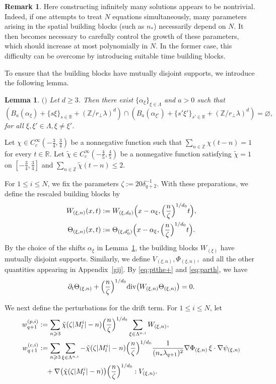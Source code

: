 \documentclass[UTF-8,reqno]{amsart}
\numberwithin{equation}{section}
\newtheorem{lemma}[theorem]{Lemma}
\theoremstyle{definition}
\newtheorem{remark}[theorem]{Remark}
\def\geq{\geqslant}
\def\leq{\leqslant}
\def\div{\mathord{{\rm div}}}
\def\bl{\begin{lemma}}
\def\el{\end{lemma}}
\def\br{\begin{remark}}
\def\er{\end{remark}}
\def\geq{\geqslant}
\def\leq{\leqslant}
\def\div{\mathord{{\rm div}}}
\begin{document}
\br
 Here constructing infinitely many   solutions appears to be   nontrivial. 
Indeed, if one attempts to treat $N$ equations simultaneously, many parameters arising in the spatial building blocks (such as $n_*$) necessarily depend on $N$. 
It then becomes necessary to carefully control the growth of these parameters, which should increase at most polynomially in $N$. In the former case, this difficulty can be overcome by introducing suitable time building blocks. 
\er
To ensure that the building blocks have mutually disjoint supports, we introduce the following lemma.
\bl\label{lem:4}
$($\cite[Lemma 3]{BMS}$)$
Let $d\geq3$. Then there exist $\{\alpha_\xi\}_{\xi\in\Lambda}$ and $a>0$ such that
$$(B_a(\alpha_\xi)+\{s\xi\}_{s\in \mathbb{R}}+(\mathbb{Z}/r_\perp\lambda)^d)\cap
(B_a(\alpha_{\xi'})+\{s'\xi'\}_{s'\in \mathbb{R}}+(\mathbb{Z}/r_\perp\lambda)^d)=\varnothing,$$
for all $\xi,\xi'\in\Lambda ,\xi\neq\xi'$.
\el 


Let
$
\chi\in C_c^\infty(-\frac34,\frac34)
$
be a nonnegative function such that
$
\sum_{n\in\mathbb{Z}}\chi(t-n)=1
$
for every $t\in\mathbb{R}$.
Let
$
\tilde{\chi}\in C_c^\infty(-\frac45,\frac45)
$
be a nonnegative function satisfying
$
\tilde{\chi}=1
$
on
$
[-\frac34,\frac34]
$
and
$
\sum_{n\in\mathbb{Z}}\tilde{\chi}(t-n)\leq2.
$

For $1\leq i\leq N$, we fix the parameters
$
\zeta:=20\delta_{q+2}^{-1}.
$ 
With these preparations, we define the rescaled building blocks by
\begin{align*}
W_{(\xi,n)}(x,t)
&:=
W_{(\xi,d_0)}
\Bigl(
x-\alpha_\xi,
\Bigl(\frac{n}{\zeta}\Bigr)^{1/d_0}
t
\Bigr),
\\
\Theta_{(\xi,n)}(x,t)
&:=
\Theta_{(\xi,d_0')}
\Bigl(
x-\alpha_\xi,
\Bigl(\frac{n}{\zeta}\Bigr)^{1/d_0}
t
\Bigr).
\end{align*}
By the choice of the shifts $\alpha_\xi$ in Lemma~\ref{lem:4}, the building blocks $W_{(\xi)}$ have mutually disjoint supports.
Similarly, we define
$
V_{(\xi,n)},
\Phi_{(\xi,n)},
$
and all the other quantities appearing in Appendix~\ref{gij}. 
By \eqref{eq:ptthe+} and \eqref{eq:parth}, we have
\begin{align}
\partial_t\Theta_{(\xi,n)}
+
\Bigl(\frac{n}{\zeta}\Bigr)^{1/d_0}
\div\bigl(
W_{(\xi,n)}\Theta_{(\xi,n)}
\bigr)
=
0. \notag
\end{align}

We next define the perturbations for the drift term. 
For $1\leq i\leq N$, let
\begin{align*}
w_{q+1}^{(p,i)}
&:=
\sum_{n\geq3}
\tilde{\chi}(\zeta|M_l^i|-n)
\Bigl(\frac{n}{\zeta}\Bigr)^{1/d_0}
\sum_{\xi\in\Lambda^{n,i}}
W_{(\xi,n)},\notag\\
w_{q+1}^{(c,i)}
&:=
\sum_{n\geq3}
\sum_{\xi\in\Lambda^{n,i}}
-\tilde{\chi}(\zeta|M_l^i|-n)
\Bigl(\frac{n}{\zeta}\Bigr)^{1/d_0}
\frac1{(n_*\lambda_{q+1})^2}
\nabla\Phi_{(\xi,n)}
\,\xi\cdot\nabla\psi_{(\xi,n)}
\\
&\quad
+
\nabla\bigl(
\tilde{\chi}(\zeta|M_l^i|-n)
\bigr)
\Bigl(\frac{n}{\zeta}\Bigr)^{1/d_0}
:V_{(\xi,n)}
.
\end{align*}
\end{document}
